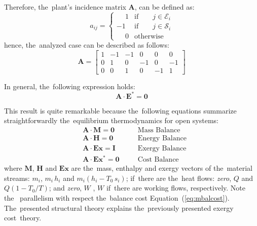 \documentclass[energies,article,accept,moreauthors,pdftex]{Definitions/mdpi}
\newcommand{\vm}[1]{\ensuremath{\mathbf{#1}}}
\begin{document}
Therefore, the~plant's incidence matrix $\vm{A}$, can be defined as:
\begin{equation}
    a_{ij}=\begin{cases}
    \phantom{-}1 & \text{if}\qquad j\in\mathcal{E}_i \\
    -1 & \text{if}\qquad j\in\mathcal{S}_i \\
    \phantom{-}0 & \text{otherwise}
    \end{cases}
\end{equation}
hence, the~analyzed case can be described as follows:
\begin{equation*}
    \vm{A}=\left[\begin{array}{rrrrrr}
    1 & -1 & -1 &  0 &  0 &  0 \\
    0 &  1 &  0 & -1 &  0 & -1 \\
    0 &  0 &  1 &  0 & -1 &  1
    \end{array}\right]
\end{equation*}

In general, the~following expression holds:
\begin{equation}
    \vm{A} \cdot \vm{E}^{*} = \vm{0}
    \label{eq:mbalcost}
\end{equation}

This result is quite remarkable because the~following equations summarize straightforwardly the~equilibrium thermodynamics for open systems:
\begin{align}
    &\vm{A}\cdot\vm{M} = \vm{0} &\quad & \text{Mass Balance} \label{eq:a1} \\
    &\vm{A}\cdot\vm{H} = \vm{0} &\quad & \text{Energy Balance} \label{eq:a2}\\
    &\vm{A}\cdot\vm{Ex} = \vm{I} &\quad & \text{Exergy Balance} \label{eq:a3}\\
    &\vm{A}\cdot\vm{Ex^*} = \vm{0} &\quad & \text{Cost Balance} \label{eq:a4}
\end{align}
where \vm{M}, \vm{H} and \vm{Ex} are the~mass, enthalpy and exergy vectors of the~material streams: $m_i$, $m_i\,h_i$ and $m_i(h_i-T_0\,s_i)$; if~there are the~heat flows: \emph{zero}, $Q$ and $Q(1-T_0/T)$; and \emph{zero}, $W$ , $W$ if~there are working flows, respectively. Note the~ parallelism with respect the~balance cost Equation~(\ref{eq:mbalcost}). The~presented structural theory explains the~previously presented exergy cost~theory.
\end{document}
